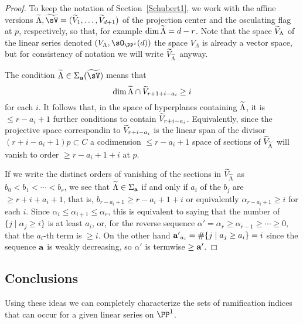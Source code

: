

\begin{proof}
To keep the notation of Section~\ref{Schubert1}, we work with the affine versions
$\tL, \tsV = (\tV_1, \dots, \tV_{d+1})$ of the projection center and the osculating flag at $p$, respectively,
so that, for example $\dim \tL = d-r$. Note that the space $\tV_\Lambda$ of the linear series 
denoted $(V_\Lambda, \sO_{\PP^1}(d))$ the space $V_\Lambda$
is already a vector space, but for consistency of notation we will write $\tV_\tL$ anyway.

The condition $\tL \in \Sigma_{\bf a}({\tsV})$
 means that 
$$
\dim \tL \cap \tV_{r+1+i-a_i} \geq i
$$
for each $i$. It follows that, 
in the space of hyperplanes containing $\tL$, it is $\leq r-a_i+1$ further conditions to contain $\tV_{r+i-a_i}$. Equivalently,
since the projective space correspondin to $\tV_{r+i-a_i}$ is the linear span of the divisor $(r+i-a_i+1)p\subset C$
a codimension $\leq r-a_i+1$ space of sections of $\tV_\tL$ will vanish to order $\geq r -a_i+1+i$ at $p$. 

If we write the distinct orders of vanishing of the sections in $\tV_\tL$ as
$b_0 < b_1<  \cdots < b_r$, we see that $\tL \in \Sigma_{\bf a}$  if and only if
$a_i$ of the $b_j$ are $\geq r+i+a_i+1$, that is,
$b_{r-a_i+1}\geq r-a_i+1+i$ or equivalently $\alpha_{r-a_i+1}\geq i$ for each $i$.
Since $\alpha_i\leq \alpha_{i+1} \leq \alpha_r$,
this is equivalent to saying that the number of $\{j \mid \alpha_j \geq i\}$ is at least $a_i$, or, for the
reverse sequence $\alpha' = \alpha_r \geq \alpha_{r-1} \geq \cdots \geq 0$, that the $a_i$-th term is $\geq i$.
On the other hand ${\bf a'}_{a_i} = \#\{j\mid a_j \geq a_i\} = i$ since the sequence ${\bf a}$ is weakly
decreasing, so $\alpha'$ is termwise $\geq {\bf a'}$.
\end{proof}

\subsection{Conclusions}

Using these ideas we can completely characterize the sets of ramification indices that can occur for a given
linear series on $\PP^1$. 


